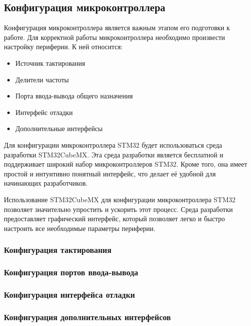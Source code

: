 \subsection{Конфигурация микроконтроллера}
Конфигурация микроконтроллера является важным этапом его подготовки к работе. Для корректной работы микроконтроллера необходимо произвести настройку периферии. К ней относится:
\begin{itemize}
    \item Источник тактирования
    \item Делители частоты
    \item Порта ввода-вывода общего назначения
    \item Интерфейс отладки
    \item Дополнительные интерфейсы
\end{itemize}
Для конфигурации микроконтроллера STM32 будет использоваться среда разработки STM32CubeMX. Эта среда разработки является бесплатной и поддерживает широкий набор микроконтроллеров STM32. Кроме того, она имеет простой и интуитивно понятный интерфейс, что делает её удобной для начинающих разработчиков.

Использование STM32CubeMX для конфигурации микроконтроллера STM32 позволяет значительно упростить и ускорить этот процесс. Среда разработки предоставляет графический интерфейс, который позволяет легко и быстро настроить все необходимые параметры периферии.

\subsubsection{Конфигурация тактирования}
\subsubsection{Конфигурация портов ввода-вывода}
\subsubsection{Конфигурация интерфейса отладки}
\subsubsection{Конфигурация дополнительных интерфейсов}